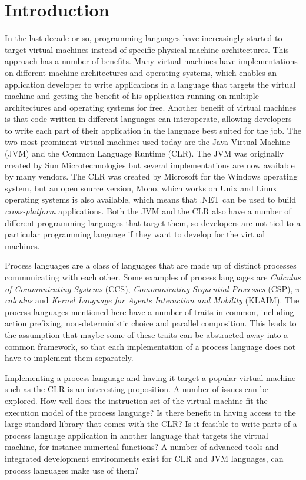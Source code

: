 \chapter{Introduction}

	In the last decade or so, programming languages have increasingly started to 
	target virtual machines instead of specific physical machine architectures. 
	This approach has a number of benefits. Many virtual machines have 
	implementations on different machine architectures and operating systems, 
	which enables an application developer to write applications in a language 
	that targets the virtual machine and getting the benefit of his application 
	running on multiple architectures and operating systems for free. Another 
	benefit of virtual machines is that code written in different languages can 
	interoperate, allowing developers to write each part of their application in 
	the language best suited for the job. The two most prominent virtual 
	machines used today are the Java Virtual Machine (JVM) and the Common 
	Language Runtime (CLR). The JVM was originally created by Sun 
	Microtechnologies but several implementations are now available by many 
	vendors. The CLR was created by Microsoft for the Windows operating system, 
	but an open source version, Mono, which works on Unix and Linux operating 
	systems is also available, which means that .NET can be used to build
	\textit{cross-platform} applications. Both the JVM and the CLR also have a 
	number of different programming languages that target them, so developers 
	are not tied to a particular programming language if they want to develop 
	for the virtual machines.

	Process languages are a class of languages that are made up of distinct 
	processes communicating with each other. Some examples of process languages 
	are \textit{Calculus of Communicating Systems} (CCS), \textit{Communicating 
	Sequential Processes} (CSP), $\pi$ \textit{calculus} and \textit{Kernel 
	Language for Agents Interaction and Mobility} (KLAIM). The process languages 
	mentioned here have a number of traits in common, including action 
	prefixing, non-deterministic choice and parallel composition. This leads to 
	the assumption that maybe some of these traits can be abstracted away into a 
	common framework, so that each implementation of a process language does not 
	have to implement them separately.

	Implementing a process language and having it target a popular virtual 
	machine such as the CLR is an interesting proposition. A number of issues 
	can be explored. How well does the instruction set of the virtual machine 
	fit the execution model of the process language? Is there benefit in having 
	access to the large standard library that comes with the CLR? Is it feasible 
	to write parts of a process language application in another language that 
	targets the virtual machine, for instance numerical functions? A number of 
	advanced tools and integrated development environments exist for CLR and JVM 
	languages, can process languages make use of them? 


